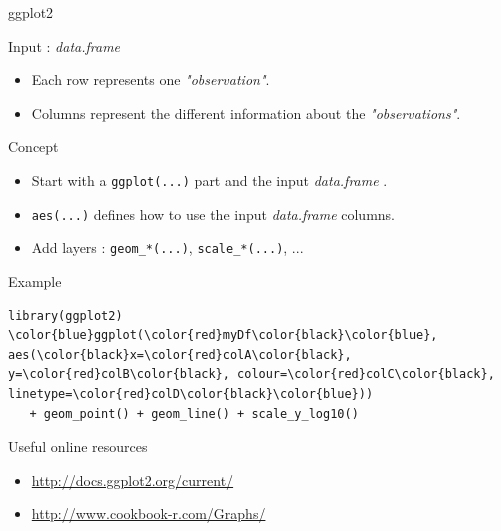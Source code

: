 \documentclass[10pt]{beamer}
\newcommand{\df}{{\it data.frame} }
\begin{document}
\begin{frame}[fragile, shrink=10]{{\sf ggplot2}}
  \begin{block}{Input : \df}
    \begin{itemize}
    \item Each row represents one {\it "observation"}.
    \item Columns represent the different information about the {\it "observations"}.
    \end{itemize}
  \end{block}

  \begin{block}{Concept}
    \begin{itemize}
    \item Start with a \verb!ggplot(...)! part and the input \df.
    \item \verb!aes(...)! defines how to use the input \df columns.
    \item Add layers : \verb!geom_*(...)!, \verb!scale_*(...)!, ...
    \end{itemize}
  \end{block}
  
  \begin{exampleblock}{Example}
\begin{Verbatim}[commandchars=\\\{\}]
library(ggplot2)
\color{blue}ggplot(\color{red}myDf\color{black}\color{blue}, aes(\color{black}x=\color{red}colA\color{black}, y=\color{red}colB\color{black}, colour=\color{red}colC\color{black}, linetype=\color{red}colD\color{black}\color{blue})) 
   + geom_point() + geom_line() + scale_y_log10()
\end{Verbatim}
  \end{exampleblock}
  
  \begin{block}{Useful online resources}
    \begin{itemize}
    \item \url{http://docs.ggplot2.org/current/}
    \item \url{http://www.cookbook-r.com/Graphs/}
    \end{itemize}
  \end{block}
  
\end{frame}
\end{document}
